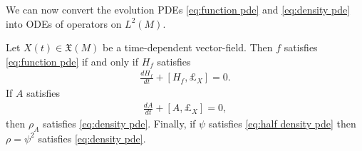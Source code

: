 \documentclass[final,leqno]{siamltex1213}
\begin{document}
We can now convert the evolution PDEs \eqref{eq:function pde} and \eqref{eq:density pde} into ODEs of operators on $L^{2}(M)$.

\begin{theorem} \label{thm:quantize}
	Let $X(t) \in \mathfrak{X}(M)$ be a time-dependent vector-field.
	Then $f$ satisfies \eqref{eq:function pde}
	if and only if $H_{f}$ satisfies
	\begin{align}
		\frac{d H_{f} }{dt} + [ H_{f} , \pounds_{X} ] = 0. \label{eq:quantum observable ode}
	\end{align}
	If $A$ satisfies
	\begin{align}
		\frac{dA}{dt} + [ A , \pounds_{X} ] = 0, \label{eq:quantum density ode}
	\end{align}
	then $\rho_{A}$ satisfies \eqref{eq:density pde}.
	Finally, if $\psi$ satisfies \eqref{eq:half density pde}
	then $\rho = \psi^{2}$ satisfies \eqref{eq:density pde}.
\end{theorem}
\end{document}

